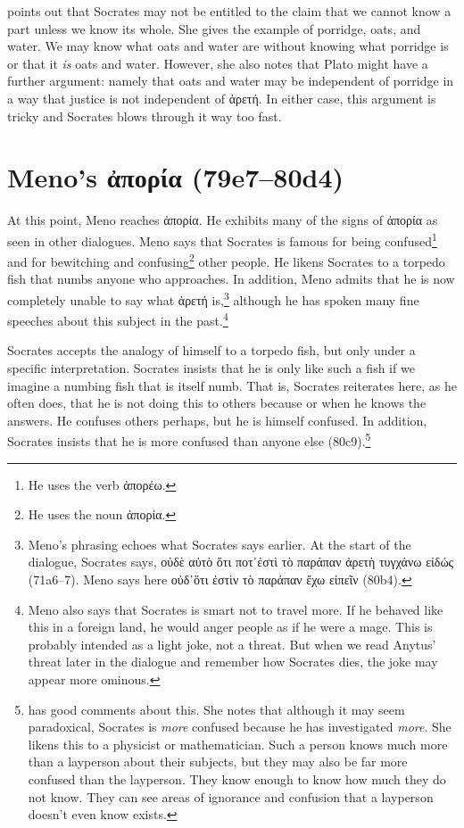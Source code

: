 \documentclass[12pt,letterpaper]{article}
\begin{document}
\textcite[59]{fine2014} points out that Socrates may not be entitled to the claim that we cannot know a part unless we know its whole. She gives the example of porridge, oats, and water. We may know what oats and water are without knowing what porridge is or that it \textit{is} oats and water. However, she also notes that Plato might have a further argument: namely that oats and water may be independent of porridge in a way that justice is not independent of \textgreek{ἀρετή}. In either case, this argument is tricky and Socrates blows through it way too fast.  

\section*{Meno's \textgreek{ἀπορία} (79e7--80d4)}

At this point, Meno reaches \textgreek{ἀπορία}. He exhibits many of the signs of \textgreek{ἀπορία} as seen in other dialogues. Meno says that Socrates is famous for being confused\footnote{He uses the verb \textgreek{ἀπορέω}.} and for bewitching and confusing\footnote{He uses the noun \textgreek{ἀπορία}.} other people. He likens Socrates to a torpedo fish that numbs anyone who approaches. In addition, Meno admits that he is now completely unable to say what \textgreek{ἀρετή} is,\footnote{Meno's phrasing echoes what Socrates says earlier. At the start of the dialogue, Socrates says, \textgreek{οὐδὲ αὐτὸ ὅτι ποτ᾽ἐστὶ τὸ παράπαν ἀρετὴ τυγχάνω εἰδώς} (71a6--7). Meno says here \textgreek{οὐδ᾽ὅτι ἐστὶν τὸ παράπαν ἔχω εἰπεῖν} (80b4).} although he has spoken many fine speeches about this subject in the past.\footnote{Meno also says that Socrates is smart not to travel more. If he behaved like this in a foreign land, he would anger people as if he were a mage. This is probably intended as a light joke, not a threat. But when we read Anytus' threat later in the dialogue and remember how Socrates dies, the joke may appear more ominous.}

Socrates accepts the analogy of himself to a torpedo fish, but only under a specific interpretation. Socrates insists that he is only like such a fish if we imagine a numbing fish that is itself numb. That is, Socrates reiterates here, as he often does, that he is not doing this to others because or when he knows the answers. He confuses others perhaps, but he is himself confused. In addition, Socrates insists that he is more confused than anyone else (80c9).\footnote{\textcite[71--72]{fine2014} has good comments about this. She notes that although it may seem paradoxical, Socrates is \textit{more} confused because he has investigated \textit{more}. She likens this to a physicist or mathematician. Such a person knows much more than a layperson about their subjects, but they may also be far more confused than the layperson. They know enough to know how much they do not know. They can see areas of ignorance and confusion that a layperson doesn't even know exists.}
\end{document}
